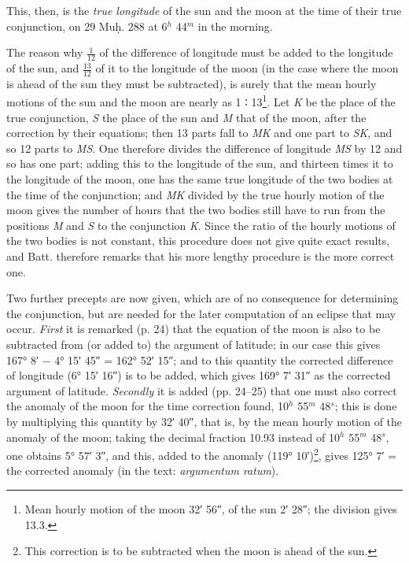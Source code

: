 \documentclass[11pt]{article}
\newcommand{\Pg}[1]{\marginpar{\footnotesize\color{gray}#1}}
\begin{document}
\par This, then, is the \emph{true longitude} of the sun and the moon at the time of their true conjunction, on 29 Muḥ. 288 at 6$^{h}$ 44$^{m}$ in the morning.\par
\par \Pg{84}The reason why $\tfrac{1}{12}$ of the difference of longitude must be added to the longitude of the sun, and $\tfrac{13}{12}$ of it to the longitude of the moon (in the case where the moon is ahead of the sun they must be subtracted), is surely that the mean hourly motions of the sun and the moon are nearly as 1 {\SignFont\upshape ∶} 13\footnote{Mean hourly motion of the moon 32′ 56″, of the sun 2′ 28″; the division gives 13.3.}. Let \emph{K} be the place of the true conjunction, \emph{S} the place of the sun and \emph{M} that of the moon, after the correction by their equations; then 13 parts fall to \emph{MK} and one part to \emph{SK}, and so 12 parts to \emph{MS}. One therefore divides the difference of longitude \emph{MS} by 12 and so has one part; adding this to the longitude of the sun, and thirteen times it to the longitude of the moon, one has the same true longitude of the two bodies at the time of the conjunction; and \emph{MK} divided by the true hourly motion of the moon gives the number of hours that the two bodies still have to run from the positions \emph{M} and \emph{S} to the conjunction \emph{K}. Since the ratio of the hourly motions of the two bodies is not constant, this procedure does not give quite exact results, and Batt. therefore remarks that his more lengthy procedure is the more correct one.\par
\par Two further precepts are now given, which are of no consequence for determining the conjunction, but are needed for the later computation of an eclipse that may occur. \emph{First} it is remarked (p. 24) that the equation of the moon is also to be subtracted from (or added to) the argument of latitude; in our case this gives 167° 8′ − 4° 15′ 45″ = 162° 52′ 15″; and to this quantity the corrected difference of longitude (6° 15′ 16″) is to be added, which gives 169° 7′ 31″ as the corrected argument of latitude. \emph{Secondly} it is added (pp. 24–25) that one must also correct the anomaly of the moon for the time correction found, 10$^{h}$ 55$^{m}$ 48$^{s}$; this is done by multiplying this quantity by 32′ 40″, that is, by the mean hourly motion of the anomaly of the moon; taking the decimal fraction 10.93 instead of 10$^{h}$ 55$^{m}$ 48$^{s}$, one obtains 5° 57′ 3″, and this, added to the anomaly (119° 10′)\footnote{This correction is to be subtracted when the moon is ahead of the sun.}, gives 125° 7′ = the corrected anomaly (in the text: \emph{argumentum ratum}).\par
\end{document}
